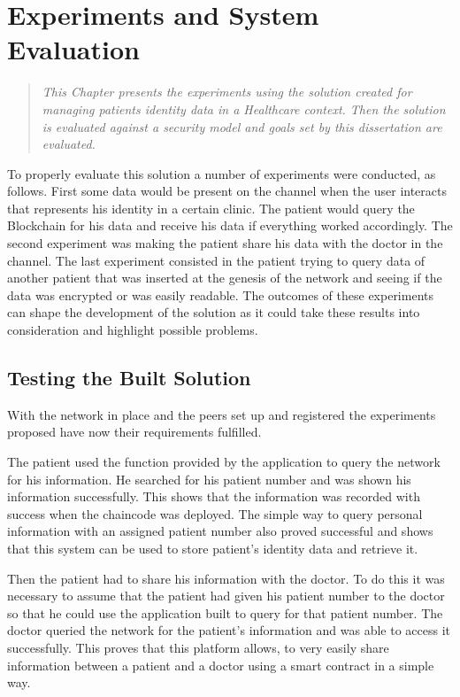 \chapter{Experiments and System Evaluation} 
\label{experiments}

\begin{quote}
\emph{This Chapter presents the experiments using the solution created for
  managing patients identity data in a Healthcare context. Then the solution is
  evaluated against a security model and goals set by this dissertation are
  evaluated.}
\end{quote}

To properly evaluate this solution a number of experiments were conducted, as
follows. First some data would be present on the channel when the user
interacts that represents his identity in a certain clinic. The patient would
query the Blockchain for his data and receive his data if everything worked
accordingly. The second experiment was making the patient share his data with
the doctor in the channel. The last experiment consisted in the patient trying
to query data of another patient that was inserted at the genesis of the
network and seeing if the data was encrypted or was easily readable. The
outcomes of these experiments can shape the development of the solution as it
could take these results into consideration and highlight possible problems.

\section{Testing the Built Solution}

With the network in place and the peers set up and registered the experiments
proposed have now their requirements fulfilled.

The patient used the function provided by the application to query the network
for his information. He searched for his patient number and was shown his
information successfully. This shows that the information was recorded with
success when the chaincode was deployed. The simple way to query personal
information with an assigned patient number also proved successful and shows
that this system can be used to store patient's identity data and retrieve it.

Then the patient had to share his information with the doctor. To do this it
was necessary to assume that the patient had given his patient number to the
doctor so that he could use the application built to query for that patient
number. The doctor queried the network for the patient's information and was
able to access it successfully. This proves that this platform allows, to very
easily share information between a patient and a doctor using a smart contract
in a simple way.

